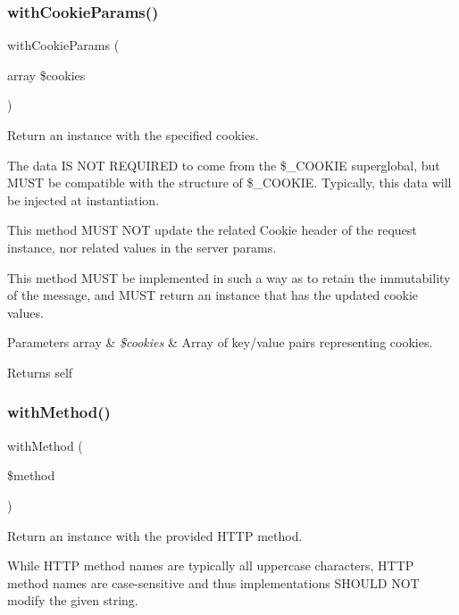 \subsubsection{\texorpdfstring{with\+Cookie\+Params()}{withCookieParams()}}
{\footnotesize\ttfamily with\+Cookie\+Params (\begin{DoxyParamCaption}\item[{array}]{\$cookies }\end{DoxyParamCaption})}

Return an instance with the specified cookies.

The data IS N\+OT R\+E\+Q\+U\+I\+R\+ED to come from the \$\+\_\+\+C\+O\+O\+K\+IE superglobal, but M\+U\+ST be compatible with the structure of \$\+\_\+\+C\+O\+O\+K\+IE. Typically, this data will be injected at instantiation.

This method M\+U\+ST N\+OT update the related Cookie header of the request instance, nor related values in the server params.

This method M\+U\+ST be implemented in such a way as to retain the immutability of the message, and M\+U\+ST return an instance that has the updated cookie values.


\begin{DoxyParams}[1]{Parameters}
array & {\em \$cookies} & Array of key/value pairs representing cookies. \\
\hline
\end{DoxyParams}
\begin{DoxyReturn}{Returns}
self 
\end{DoxyReturn}
\mbox{\label{class_pes_1_1_http_1_1_request_ac4df752c7c8100d173304e336d665c2b}} 
\subsubsection{\texorpdfstring{with\+Method()}{withMethod()}}
{\footnotesize\ttfamily with\+Method (\begin{DoxyParamCaption}\item[{}]{\$method }\end{DoxyParamCaption})}

Return an instance with the provided H\+T\+TP method.

While H\+T\+TP method names are typically all uppercase characters, H\+T\+TP method names are case-\/sensitive and thus implementations S\+H\+O\+U\+LD N\+OT modify the given string.

